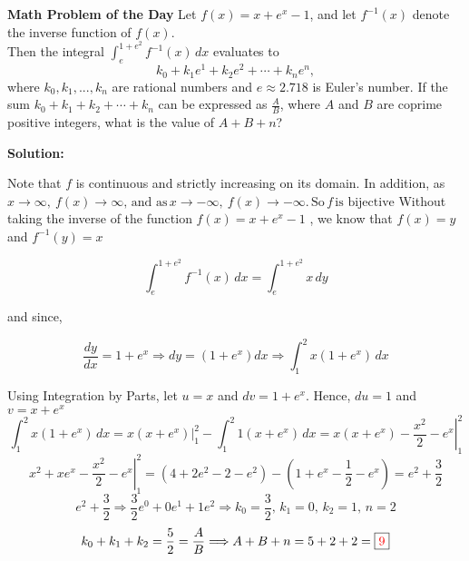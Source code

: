 \documentclass[12pt]{article}
\newcommand*\Eval[3]{\left.#1\right\rvert_{#2}^{#3}}
\begin{document}
	\centering
	\large{\textbf{Math Problem of the Day}}
	\justify
		Let $ f(x) = x + e^x - 1$, and let $f^{-1}(x)$ denote the inverse function of $f(x)$.\\
		Then the integral \( \displaystyle \int_{e}^{1+e^2} f^{-1}(x) \, dx \) evaluates to 
		\[ k_0+k_1e^1+k_2e^2+ \dotsb + k_ne^n,  \]
		where $k_0, k_1, ... , k_n$ are rational numbers and $ e \approx 2.718 $ is Euler's number. If the sum $k_0+k_1+k_2+ \dotsb +k_n$ can be expressed as $\frac{A}{B}$, where $A$ and $B$ are coprime positive integers, what is the value of $A+B+n$?
		
		\bigskip
		\noindent
		\textbf{Solution:} 
		
		\noindent
		Note that $f$ is continuous and strictly increasing on its domain. In addition, as $x \rightarrow \infty,\ f(x) \rightarrow \infty, \, \text{and as} \, x \rightarrow - \infty, \ f(x) \rightarrow - \infty. \, \text{So} \, f \, \text{is bijective} $
		Without taking the inverse of the function $f(x) = x + e^x - 1$ , we know that $f(x) = y $ and $ f^{-1}(y) = x $
		
		\[ \int_{e}^{1+e^2} f^{-1}(x) \, dx = \int_{e}^{1+e^2} x \, dy  \]
		
		\noindent
		and since,
		
		\[ \frac{dy}{dx} = 1+e^x \Longrightarrow dy = \left( 1+e^x \right) dx \Longrightarrow \int_{1}^{2} x\left( 1+e^x \right) \, dx \]
		
		\noindent
		Using Integration by Parts, let $u = x$ and $dv = 1+e^x$. Hence, $du = 1$ and $v = x+e^x$
		\[ \int_{1}^{2} x\left( 1+e^x \right) \, dx =  \Eval{x \left( x+e^x \right)}{1}{2} - \int_{1}^{2} 1\left( x+e^x \right) \, dx  = \Eval{ x \left(x+e^x \right) - \frac{x^2}{2} -e^x}{1}{2} \]
		\[ \Eval{ x^2 + xe^x - \frac{x^2}{2} -e^x}{1}{2} =  \left( 4 + 2e^2 - 2 -e^2 \right) - \left( 1 + e^x - \frac{1}{2} -e^x \right) = e^2 + \frac{3}{2}  \]
		\[ e^2 + \frac{3}{2} \Longrightarrow \frac{3}{2}e^0 + 0e^1 +1e^2 \Longrightarrow k_0 = \frac{3}{2}, \, k_1 = 0,  \, k_2 = 1, \, n=2  \]
		\[  k_0+k_1+k_2 = \frac{5}{2} = \frac{A}{B} \Longrightarrow	A+B+n = 5+2+2 = \fbox{\textcolor{red}{9}} \]

		
\end{document}
